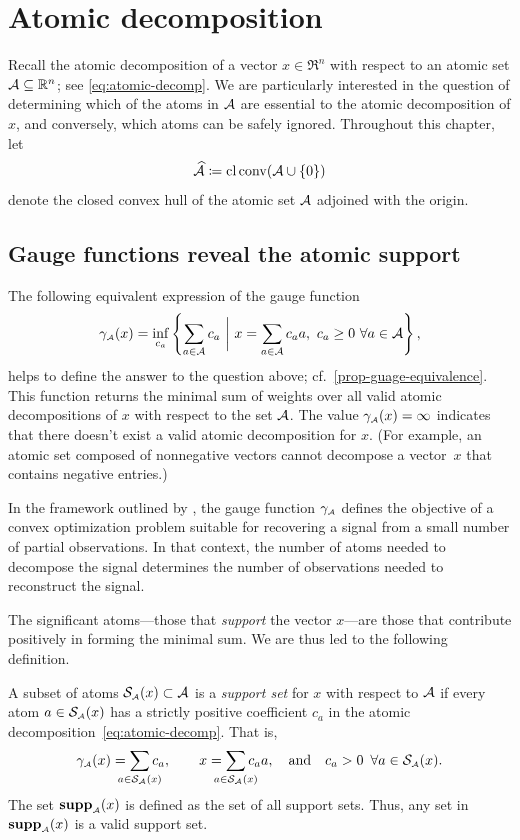 \section{Atomic decomposition} \label{sec:atomic-decomposition}
Recall the atomic decomposition of a vector $x\in\Re^n$ with respect to an atomic set $\mathcal{A}\subseteq\mathbb{R}^n$; see \eqref{eq:atomic-decomp}. We are particularly interested in the question of determining which of the atoms
in $\mathcal{A}$ are essential to the atomic decomposition of $x$, and conversely,
which atoms can be safely ignored. Throughout this chapter, let 
\[\widehat{\mathcal{A}} \coloneqq \operatorname{cl}\operatorname{conv}(\mathcal{A} \cup \{0\})\]
denote the closed convex hull of the atomic set $\mathcal{A}$ adjoined with the origin.

\subsection{Gauge functions reveal the atomic support}
The following equivalent expression of the gauge function 
\begin{equation}
    \label{eq:gauge2}
    \gamma_{\scriptscriptstyle\mathcal{A}}(x)
    = \inf_{c_a}
      \left\{ \sum_{a\in\mathcal{A}}c_a ~\bigg\vert~ x = \sum_{a\in\mathcal{A}}c_aa,\ c_a \ge0\ \forall a\in\mathcal{A} \right\},
\end{equation}
helps to define the answer to the question above; cf.~\autoref{prop-guage-equivalence}. This function returns the
minimal sum of weights over all valid atomic decompositions of $x$ with respect
to the set $\mathcal{A}$. The value $\gamma_{\scriptscriptstyle\mathcal{A}}(x)=\infty$ indicates that there doesn't
exist a valid atomic decomposition for $x$. (For example, an atomic set composed
of nonnegative vectors cannot decompose a vector~$x$ that contains negative entries.) 

In the framework outlined by \citet{chandrasekaran2012convex}, the gauge
function $\gamma_{\scriptscriptstyle\mathcal{A}}$ defines the objective of a convex optimization problem
suitable for recovering a signal from a small number of partial observations. In
that context, the number of atoms needed to decompose the signal determines the
number of observations needed to reconstruct the signal.

The significant atoms---those that \emph{support} the
vector $x$---are those that contribute positively in forming the minimal sum. We
are thus led to the following definition.

\begin{definition} \label{def:atomic_support} A subset of atoms
    $\operatorname{\mathcal{S}_{\scriptscriptstyle\mathcal{A}}}(x)\subset\mathcal{A}$ is a \emph{support set} for $x$ with respect to
    $\mathcal{A}$ if every atom $a\in\operatorname{\mathcal{S}_{\scriptscriptstyle\mathcal{A}}}(x)$ has a strictly positive coefficient
    $c_a$ in the atomic decomposition~\eqref{eq:atomic-decomp}. That is,
    \begin{equation}
      \gauge\As(x) = \sum_{\mathclap{a\in\suppa(x)}} c_a,
      \qquad x = \sum_{\mathclap{a\in\suppa(x)}} c_aa,
      \text{and} c_a > 0\enspace \forall a\in\suppa(x).
    \end{equation}
    The set $\operatorname{\hbox{\rm\textbf{supp}}}_{\scriptscriptstyle\mathcal{A}}(x)$ is defined as the set of all support
    sets. Thus, any set in $\operatorname{\hbox{\rm\textbf{supp}}}_{\scriptscriptstyle\mathcal{A}}(x)$ is a valid support set. 
  \end{definition}

